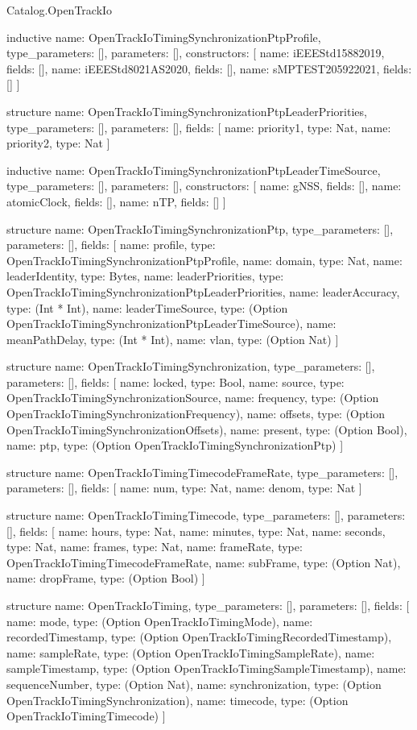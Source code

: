 \begin{lexlean}{Catalog.OpenTrackIo}
\begin{semanticmodule}
inductive{
  name: OpenTrackIoTimingSynchronizationPtpProfile,
  type_parameters: [],
  parameters: [],
  constructors: [
    {name: iEEEStd15882019, fields: []},
    {name: iEEEStd8021AS2020, fields: []},
    {name: sMPTEST205922021, fields: []}
  ]
}

structure{
  name: OpenTrackIoTimingSynchronizationPtpLeaderPriorities,
  type_parameters: [],
  parameters: [],
  fields: [
    {name: priority1, type: Nat},
    {name: priority2, type: Nat}
  ]
}

inductive{
  name: OpenTrackIoTimingSynchronizationPtpLeaderTimeSource,
  type_parameters: [],
  parameters: [],
  constructors: [
    {name: gNSS, fields: []},
    {name: atomicClock, fields: []},
    {name: nTP, fields: []}
  ]
}

structure{
  name: OpenTrackIoTimingSynchronizationPtp,
  type_parameters: [],
  parameters: [],
  fields: [
    {name: profile, type: OpenTrackIoTimingSynchronizationPtpProfile},
    {name: domain, type: Nat},
    {name: leaderIdentity, type: Bytes},
    {name: leaderPriorities, type: OpenTrackIoTimingSynchronizationPtpLeaderPriorities},
    {name: leaderAccuracy, type: (Int * Int)},
    {name: leaderTimeSource, type: (Option OpenTrackIoTimingSynchronizationPtpLeaderTimeSource)},
    {name: meanPathDelay, type: (Int * Int)},
    {name: vlan, type: (Option Nat)}
  ]
}

structure{
  name: OpenTrackIoTimingSynchronization,
  type_parameters: [],
  parameters: [],
  fields: [
    {name: locked, type: Bool},
    {name: source, type: OpenTrackIoTimingSynchronizationSource},
    {name: frequency, type: (Option OpenTrackIoTimingSynchronizationFrequency)},
    {name: offsets, type: (Option OpenTrackIoTimingSynchronizationOffsets)},
    {name: present, type: (Option Bool)},
    {name: ptp, type: (Option OpenTrackIoTimingSynchronizationPtp)}
  ]
}

structure{
  name: OpenTrackIoTimingTimecodeFrameRate,
  type_parameters: [],
  parameters: [],
  fields: [
    {name: num, type: Nat},
    {name: denom, type: Nat}
  ]
}

structure{
  name: OpenTrackIoTimingTimecode,
  type_parameters: [],
  parameters: [],
  fields: [
    {name: hours, type: Nat},
    {name: minutes, type: Nat},
    {name: seconds, type: Nat},
    {name: frames, type: Nat},
    {name: frameRate, type: OpenTrackIoTimingTimecodeFrameRate},
    {name: subFrame, type: (Option Nat)},
    {name: dropFrame, type: (Option Bool)}
  ]
}

structure{
  name: OpenTrackIoTiming,
  type_parameters: [],
  parameters: [],
  fields: [
    {name: mode, type: (Option OpenTrackIoTimingMode)},
    {name: recordedTimestamp, type: (Option OpenTrackIoTimingRecordedTimestamp)},
    {name: sampleRate, type: (Option OpenTrackIoTimingSampleRate)},
    {name: sampleTimestamp, type: (Option OpenTrackIoTimingSampleTimestamp)},
    {name: sequenceNumber, type: (Option Nat)},
    {name: synchronization, type: (Option OpenTrackIoTimingSynchronization)},
    {name: timecode, type: (Option OpenTrackIoTimingTimecode)}
  ]
}


\end{semanticmodule}
\end{lexlean}

